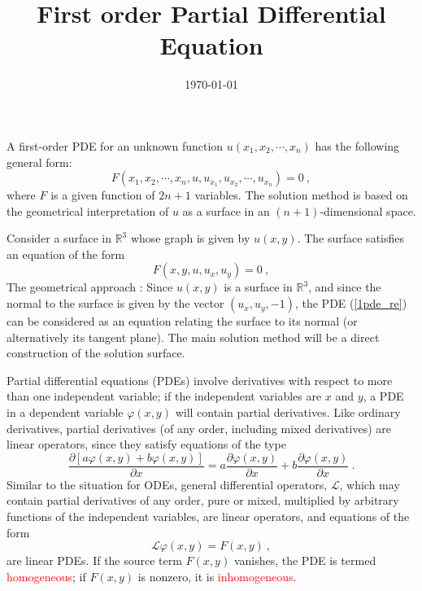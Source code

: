 \documentclass[12pt,a4paper]{article}
\title{First order Partial Differential Equation}
\author{}
\date{\today}
\begin{document}
\maketitle


\cite{pinchover2005introduction} A first-order PDE for an unknown function $u(x_1, x_2, \cdots, x_n)$ has the following general form:
\begin{equation}
F(x_1, x_2, \cdots, x_n, u, u_{x_1}, u_{x_2}, \cdots, u_{x_n} ) = 0 ~,
\end{equation}
where $F$ is a given function of $2n + 1$ variables. The solution method is based on the geometrical interpretation of $u$ as a surface in an $(n + 1)$-dimensional space.

Consider a surface in ${\mathbb R}^3$ whose graph is given by $u(x, y)$. The surface satisfies an equation of the form
\begin{equation}
F(x, y, u, u_{x}, u_{y}) = 0 ~,
\label{1pde_re}
\end{equation}
The geometrical approach : Since $u(x, y)$ is a surface in ${\mathbb R}^3$, and since the normal to the surface is given by the vector $(u_x, u_y , -1)$, the PDE (\ref{1pde_re}) can be considered as an equation relating the surface to its normal (or alternatively its tangent plane). The main solution method will be a direct construction of the solution surface.


\cite{arfken} Partial differential equations (PDEs) involve derivatives with respect to more than one independent variable; if the independent variables are $x$ and $y$, a PDE in a dependent variable $\varphi(x, y)$ will contain partial derivatives. Like ordinary derivatives, partial derivatives (of any order, including mixed derivatives) are linear operators, since they satisfy equations of the type
\begin{equation}
\dfrac{\partial [a \varphi(x,y) +b\varphi(x,y)]}{\partial x} = a \dfrac{\partial \varphi(x,y) }{\partial x} +b\dfrac{\partial \varphi(x,y)}{\partial x} ~.
\end{equation}
Similar to the situation for ODEs, general differential operators, $\mathcal L$, which may contain partial derivatives of any order, pure or mixed, multiplied by arbitrary functions of the independent variables, are linear operators, and equations of the form
\begin{equation}
\mathcal L \varphi(x,y) = F(x,y) ~,
\end{equation}
are linear PDEs. If the source term $F(x, y)$ vanishes, the PDE is termed \textcolor{red}{homogeneous}; if $F(x, y)$ is nonzero, it is \textcolor{red}{inhomogeneous}.
\end{document}
